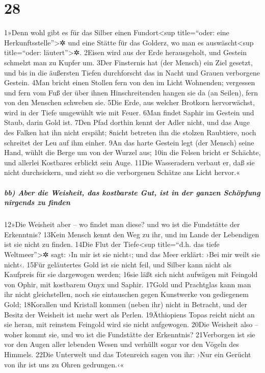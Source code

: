 \hypertarget{section-27}{%
\section{28}\label{section-27}}

1»Denn wohl gibt es für das Silber einen Fundort\textless sup
title=``oder: eine Herkunftsstelle''\textgreater✲ und eine Stätte für
das Golderz, wo man es auswäscht\textless sup title=``oder:
läutert''\textgreater✲. 2Eisen wird aus der Erde herausgeholt, und
Gestein schmelzt man zu Kupfer um. 3Der Finsternis hat (der Mensch) ein
Ziel gesetzt, und bis in die äußersten Tiefen durchforscht das in Nacht
und Grauen verborgene Gestein. 4Man bricht einen Stollen fern von den im
Licht Wohnenden; vergessen und fern vom Fuß der über ihnen
Hinschreitenden hangen sie da (an Seilen), fern von den Menschen
schweben sie. 5Die Erde, aus welcher Brotkorn hervorwächst, wird in der
Tiefe umgewühlt wie mit Feuer. 6Man findet Saphir im Gestein und Staub,
darin Gold ist. 7Den Pfad dorthin kennt der Adler nicht, und das Auge
des Falken hat ihn nicht erspäht; 8nicht betreten ihn die stolzen
Raubtiere, noch schreitet der Leu auf ihm einher. 9An das harte Gestein
legt (der Mensch) seine Hand, wühlt die Berge um von der Wurzel aus;
10in die Felsen bricht er Schächte, und allerlei Kostbares erblickt sein
Auge. 11Die Wasseradern verbaut er, daß sie nicht durchsickern, und
zieht so die verborgenen Schätze ans Licht hervor.«

\hypertarget{bb-aber-die-weisheit-das-kostbarste-gut-ist-in-der-ganzen-schuxf6pfung-nirgends-zu-finden}{%
\subparagraph{bb) Aber die Weisheit, das kostbarste Gut, ist in der
ganzen Schöpfung nirgends zu
finden}\label{bb-aber-die-weisheit-das-kostbarste-gut-ist-in-der-ganzen-schuxf6pfung-nirgends-zu-finden}}

12»Die Weisheit aber -- wo findet man diese? und wo ist die Fundstätte
der Erkenntnis? 13Kein Mensch kennt den Weg zu ihr, und im Lande der
Lebendigen ist sie nicht zu finden. 14Die Flut der Tiefe\textless sup
title=``d.h. das tiefe Weltmeer''\textgreater✲ sagt: ›In mir ist sie
nicht‹; und das Meer erklärt: ›Bei mir weilt sie nicht‹. 15Für
geläutertes Gold ist sie nicht feil, und Silber kann nicht als Kaufpreis
für sie dargewogen werden; 16sie läßt sich nicht aufwägen mit Feingold
von Ophir, mit kostbarem Onyx und Saphir. 17Gold und Prachtglas kann man
ihr nicht gleichstellen, noch sie eintauschen gegen Kunstwerke von
gediegenem Gold; 18Korallen und Kristall kommen (neben ihr) nicht in
Betracht, und der Besitz der Weisheit ist mehr wert als Perlen.
19Äthiopiens Topas reicht nicht an sie heran, mit reinstem Feingold wird
sie nicht aufgewogen. 20Die Weisheit also -- woher kommt sie, und wo ist
die Fundstätte der Erkenntnis? 21Verborgen ist sie vor den Augen aller
lebenden Wesen und verhüllt sogar vor den Vögeln des Himmels. 22Die
Unterwelt und das Totenreich sagen von ihr: ›Nur ein Gerücht von ihr ist
uns zu Ohren gedrungen.‹«

